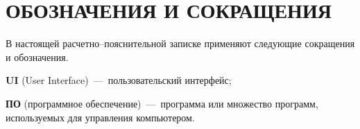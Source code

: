 \section*{ОБОЗНАЧЕНИЯ И СОКРАЩЕНИЯ}

В настоящей расчетно--пояснительной записке применяют следующие сокращения и обозначения.

\textbf{UI} (User Interface)~---~пользовательский интерфейс;

\textbf{ПО} (программное обеспечение)~---~программа или множество программ, используемых для управления компьютером.


\pagebreak